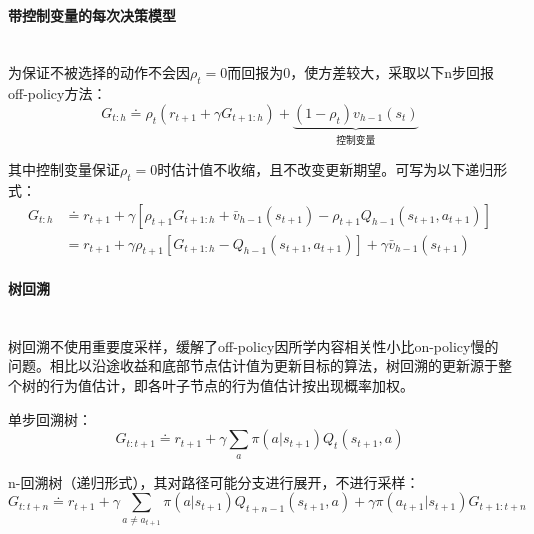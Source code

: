 \documentclass[
12pt, %
a4paper, 
oneside, %
]{scrartcl}
\begin{document}
{\paragraph{带控制变量的每次决策模型}~\\

为保证不被选择的动作不会因$ \rho_t = 0 $而回报为$ 0 $，使方差较大，采取以下n步回报off-policy方法：
$$ G_{t:h} \doteq \rho_t (r_{t + 1} + \gamma G_{t + 1:h}) + \underbrace{(1 - \rho_t) v_{h - 1}(s_t)}_{\text{控制变量}} $$

其中控制变量保证$ \rho_t = 0 $时估计值不收缩，且不改变更新期望。可写为以下递归形式：
\begin{align*}
G_{t:h} 
&\doteq r_{t + 1} + \gamma[\rho_{t + 1} G_{t + 1:h} + \bar{v}_{h - 1}(s_{t + 1}) - \rho_{t + 1} Q_{h - 1}(s_{t + 1}, a_{t + 1})] \\
&= r_{t + 1} + \gamma \rho_{t + 1}[G_{t + 1:h} - Q_{h - 1}(s_{t + 1}, a_{t + 1})] + \gamma \bar{v}_{h - 1}(s_{t + 1})
\end{align*}
\paragraph{树回溯}~\\

树回溯不使用重要度采样，缓解了off-policy因所学内容相关性小比on-policy慢的问题。相比以沿途收益和底部节点估计值为更新目标的算法，树回溯的更新源于整个树的行为值估计，即各叶子节点的行为值估计按出现概率加权。

单步回溯树：
$$ G_{t:t + 1} \doteq r_{t + 1} + \gamma \sum_{a} \pi(a|s_{t + 1}) Q_t(s_{t + 1}, a) $$

n-回溯树（递归形式），其对路径可能分支进行展开，不进行采样：
$$ G_{t:t + n} \doteq r_{t + 1} + \gamma \sum_{a \neq a_{t + 1}} \pi(a|s_{t + 1}) Q_{t + n - 1}(s_{t + 1}, a) + \gamma \pi(a_{t + 1}|s_{t + 1}) G_{t + 1:t + n} $$

}
\end{document}
